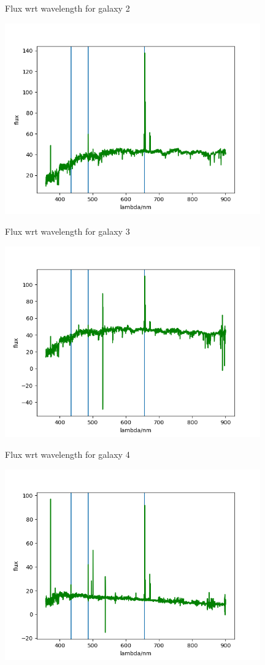 \documentclass[letterpaper,12pt]{article}
\begin{document}
\begin{table}[!h]
    \centering
    \caption{Flux wrt wavelength for galaxy 2}
    \includegraphics[width=11cm]{7-1-1.png}
\end{table}%

\begin{table}[!h]
    \centering
    \caption{Flux wrt wavelength for galaxy 3}
    \includegraphics[width=11cm]{7-1-2.png}
\end{table}%

\begin{table}[!h]
    \centering
    \caption{Flux wrt wavelength for galaxy 4}
    \includegraphics[width=11cm]{7-1-3.png}
\end{table}%
\end{document}
